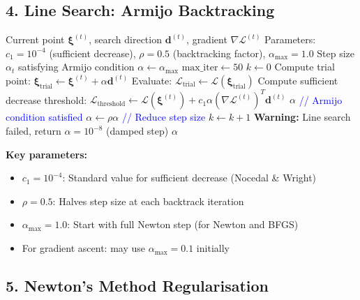 \documentclass[11pt]{article}
\begin{document}
\subsection*{4. Line Search: Armijo Backtracking}

\begin{algorithm}[H]
\caption{Armijo Backtracking Line Search}
\begin{algorithmic}[1]
\REQUIRE Current point $\bm{\xi}^{(t)}$, search direction $\bm{d}^{(t)}$, gradient $\nabla \mathcal{L}^{(t)}$
\REQUIRE Parameters: $c_1 = 10^{-4}$ (sufficient decrease), $\rho = 0.5$ (backtracking factor), $\alpha_{\max} = 1.0$
\ENSURE Step size $\alpha_t$ satisfying Armijo condition
\STATE $\alpha \leftarrow \alpha_{\max}$
\STATE $\text{max\_iter} \leftarrow 50$
\STATE $k \leftarrow 0$
    \STATE Compute trial point: $\bm{\xi}_{\text{trial}} \leftarrow \bm{\xi}^{(t)} + \alpha \bm{d}^{(t)}$
    \STATE Evaluate: $\mathcal{L}_{\text{trial}} \leftarrow \mathcal{L}(\bm{\xi}_{\text{trial}})$
    \STATE Compute sufficient decrease threshold: $\mathcal{L}_{\text{threshold}} \leftarrow \mathcal{L}(\bm{\xi}^{(t)}) + c_1 \alpha (\nabla \mathcal{L}^{(t)})^T \bm{d}^{(t)}$
        \RETURN $\alpha$ \quad \textcolor{blue}{// Armijo condition satisfied}
    \ENDIF
    \STATE $\alpha \leftarrow \rho \alpha$ \quad \textcolor{blue}{// Reduce step size}
    \STATE $k \leftarrow k + 1$
\ENDWHILE
\STATE \textbf{Warning:} Line search failed, return $\alpha = 10^{-8}$ (damped step)
\RETURN $\alpha$
\end{algorithmic}
\end{algorithm}

\textbf{Key parameters:}
\begin{itemize}
\item $c_1 = 10^{-4}$: Standard value for sufficient decrease (Nocedal \& Wright)
\item $\rho = 0.5$: Halves step size at each backtrack iteration
\item $\alpha_{\max} = 1.0$: Start with full Newton step (for Newton and BFGS)
\item For gradient ascent: may use $\alpha_{\max} = 0.1$ initially
\end{itemize}

\subsection*{5. Newton's Method Regularisation}
\end{document}
